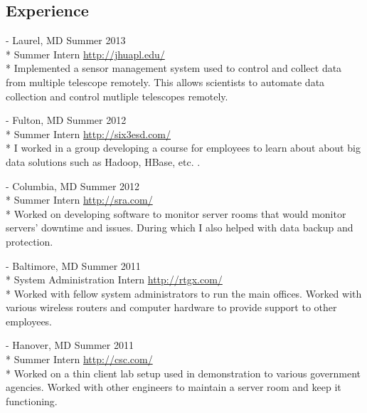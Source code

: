 \documentclass[a4paper,margin,line,11pt]{resume}
\newcommand{\rurl}[1]{\hfill {\footnotesize \url{#1}}}
\newcommand{\rdate}[1]{\hfill {\small #1}}
\renewcommand{\employer}[5]{\item[#1] - #2 \rdate{#3} \\* #4 \rurl{#5} \\*}
\begin{document}
\begin{resume}
\section{\mysidestyle Experience}
	\begin{asparadesc}
        \employer{John Hopkins University Applied Physics Laboratory}{Laurel, MD}{Summer 2013}{Summer Intern}{http://jhuapl.edu/}
        Implemented a sensor management system used to control and collect data from multiple telescope remotely. This allows scientists to automate data collection and control mutliple telescopes remotely.
        \normalsize
        \\
		\employer{Six3 Systems, Inc.}{Fulton, MD}{Summer 2012}{Summer Intern}{http://six3esd.com/}
		I worked in a group developing a course for employees to learn about about big data solutions such as Hadoop, HBase, etc. . 
		\normalsize
		\\
		\employer{SRA, International}{Columbia, MD}{Summer 2012}{Summer Intern}{http://sra.com/}
		Worked on developing software to monitor server rooms that would monitor servers' downtime and issues. During which I also helped with data backup and protection.
		\normalsize
		\\
		\employer{RTGX - Ross Technology, Inc}{Baltimore, MD}{Summer 2011}{System Administration Intern}{http://rtgx.com/}
		Worked with fellow system administrators to run the main offices. Worked with various wireless routers and computer hardware to provide support to other employees.
		\normalsize
		\\
		\employer{Computer Science Corporation}{Hanover, MD}{Summer 2011}{Summer Intern}{http://csc.com/}
		Worked on a thin client lab setup used in demonstration to various government agencies. Worked with other engineers to maintain a server room and keep it functioning.
		\normalsize
	\end{asparadesc}


\end{resume}
\end{document}
